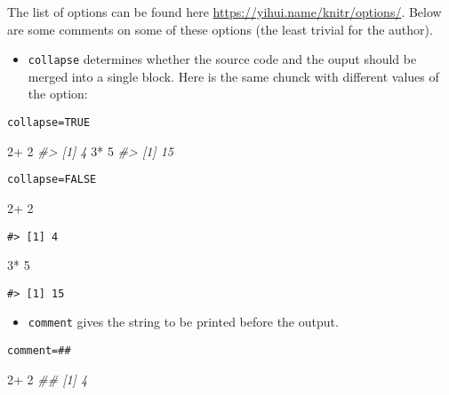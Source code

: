 \documentclass[]{book}
\newenvironment{Shaded}{}{}
\newcommand{\CommentTok}[1]{\textcolor[rgb]{0.38,0.63,0.69}{\textit{#1}}}
\newcommand{\DecValTok}[1]{\textcolor[rgb]{0.25,0.63,0.44}{#1}}
\newcommand{\OperatorTok}[1]{\textcolor[rgb]{0.40,0.40,0.40}{#1}}
\newcommand{\StringTok}[1]{\textcolor[rgb]{0.25,0.44,0.63}{#1}}
\providecommand{\tightlist}{%
  \setlength{\itemsep}{0pt}\setlength{\parskip}{0pt}}
\theoremstyle{definition}
\theoremstyle{definition}
\theoremstyle{definition}
\theoremstyle{remark}
\begin{document}
The list of options can be found here
\url{https://yihui.name/knitr/options/}. Below are some comments on some
of these options (the least trivial for the author).

\begin{itemize}
\tightlist
\item
  \texttt{collapse} determines whether the source code and the ouput
  should be merged into a single block. Here is the same chunck with
  different values of the option:
\end{itemize}

\texttt{collapse=TRUE}

\begin{Shaded}
\begin{Highlighting}[]
\DecValTok{2}\OperatorTok{+}\StringTok{ }\DecValTok{2}
\CommentTok{#> [1] 4}
\DecValTok{3}\OperatorTok{*}\StringTok{ }\DecValTok{5}
\CommentTok{#> [1] 15}
\end{Highlighting}
\end{Shaded}

\texttt{collapse=FALSE}

\begin{Shaded}
\begin{Highlighting}[]
\DecValTok{2}\OperatorTok{+}\StringTok{ }\DecValTok{2}
\end{Highlighting}
\end{Shaded}

\begin{verbatim}
#> [1] 4
\end{verbatim}

\begin{Shaded}
\begin{Highlighting}[]
\DecValTok{3}\OperatorTok{*}\StringTok{ }\DecValTok{5}
\end{Highlighting}
\end{Shaded}

\begin{verbatim}
#> [1] 15
\end{verbatim}

\begin{itemize}
\tightlist
\item
  \texttt{comment} gives the string to be printed before the output.
\end{itemize}

\texttt{comment=\textquotesingle{}\#\#\textquotesingle{}}

\begin{Shaded}
\begin{Highlighting}[]
\DecValTok{2}\OperatorTok{+}\StringTok{ }\DecValTok{2}
\CommentTok{## [1] 4}
\end{Highlighting}
\end{Shaded}
\end{document}
